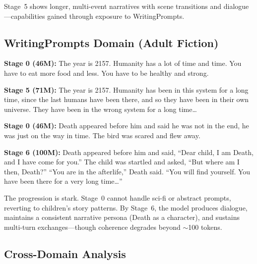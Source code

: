 Stage~5 shows longer, multi-event narratives with scene transitions and
dialogue---capabilities gained through exposure to WritingPrompts.

\subsection{WritingPrompts Domain (Adult Fiction)}

\begin{samplebox}
\textbf{Stage 0 (46M):}
The year is 2157. Humanity has a lot of time and time. You have to eat more
food and less. You have to be healthy and strong.

\textbf{Stage 5 (71M):}
The year is 2157. Humanity has been in this system for a long time, since the
last humans have been there, and so they have been in their own universe.
They have been in the wrong system for a long time\ldots
\end{samplebox}

\begin{samplebox}
\textbf{Stage 0 (46M):}
Death appeared before him and said he was not in the end, he was just on the
way in time. The bird was scared and flew away.

\textbf{Stage 6 (100M):}
Death appeared before him and said, ``Dear child, I am Death, and I have come
for you.'' The child was startled and asked, ``But where am I then, Death?''
``You are in the afterlife,'' Death said. ``You will find yourself. You have
been there for a very long time\ldots''
\end{samplebox}

The progression is stark.  Stage~0 cannot handle sci-fi or abstract prompts,
reverting to children's story patterns.  By Stage~6, the model produces
dialogue, maintains a consistent narrative persona (Death as a character),
and sustains multi-turn exchanges---though coherence degrades beyond
$\sim$100 tokens.

\subsection{Cross-Domain Analysis}

